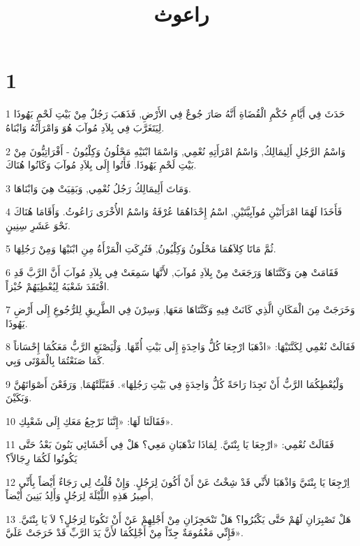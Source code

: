 

\title{راعوث}


\chapter{1}

\par 1 حَدَثَ فِي أَيَّامِ حُكْمِ الْقُضَاةِ أَنَّهُ صَارَ جُوعٌ فِي الأَرْضِ, فَذَهَبَ رَجُلٌ مِنْ بَيْتِ لَحْمِ يَهُوذَا لِيَتَغَرَّبَ فِي بِلاَدِ مُوآبَ هُوَ وَامْرَأَتُهُ وَابْنَاهُ.
\par 2 وَاسْمُ الرَّجُلِ أَلِيمَالِكُ, وَاسْمُ امْرَأَتِهِ نُعْمِي, وَاسْمَا ابْنَيْهِ مَحْلُونُ وَكِلْيُونُ - أَفْرَاتِيُّونَ مِنْ بَيْتِ لَحْمِ يَهُوذَا. فَأَتُوا إِلَى بِلاَدِ مُوآبَ وَكَانُوا هُنَاكَ.
\par 3 وَمَاتَ أَلِيمَالِكُ رَجُلُ نُعْمِي, وَبَقِيَتْ هِيَ وَابْنَاهَا.
\par 4 فَأَخَذَا لَهُمَا امْرَأَتَيْنِ مُوآبِيَّتَيْنِ, اسْمُ إِحْدَاهُمَا عُرْفَةُ وَاسْمُ الأُخْرَى رَاعُوثُ. وَأَقَامَا هُنَاكَ نَحْوَ عَشَرِ سِنِينٍ.
\par 5 ثُمَّ مَاتَا كِلاَهُمَا مَحْلُونُ وَكِلْيُونُ, فَتُرِكَتِ الْمَرْأَةُ مِنِ ابْنَيْهَا وَمِنْ رَجُلِهَا.
\par 6 فَقَامَتْ هِيَ وَكَنَّتَاهَا وَرَجَعَتْ مِنْ بِلاَدِ مُوآبَ, لأَنَّهَا سَمِعَتْ فِي بِلاَدِ مُوآبَ أَنَّ الرَّبَّ قَدِ افْتَقَدَ شَعْبَهُ لِيُعْطِيَهُمْ خُبْزاً.
\par 7 وَخَرَجَتْ مِنَ الْمَكَانِ الَّذِي كَانَتْ فِيهِ وَكَنَّتَاهَا مَعَهَا, وَسِرْنَ فِي الطَّرِيقِ لِلرُّجُوعِ إِلَى أَرْضِ يَهُوذَا.
\par 8 فَقَالَتْ نُعْمِي لِكَنَّتَيْهَا: «اذْهَبَا ارْجِعَا كُلُّ وَاحِدَةٍ إِلَى بَيْتِ أُمِّهَا. وَلْيَصْنَعِ الرَّبُّ مَعَكُمَا إِحْسَاناً كَمَا صَنَعْتُمَا بِالْمَوْتَى وَبِي.
\par 9 وَلْيُعْطِكُمَا الرَّبُّ أَنْ تَجِدَا رَاحَةً كُلُّ وَاحِدَةٍ فِي بَيْتِ رَجُلِهَا». فَقَبَّلَتْهُمَا, وَرَفَعْنَ أَصْوَاتَهُنَّ وَبَكَيْنَ.
\par 10 فَقَالَتَا لَهَا: «إِنَّنَا نَرْجِعُ مَعَكِ إِلَى شَعْبِكِ».
\par 11 فَقَالَتْ نُعْمِي: «ارْجِعَا يَا بِنْتَيَّ. لِمَاذَا تَذْهَبَانِ مَعِي؟ هَلْ فِي أَحْشَائِي بَنُونَ بَعْدُ حَتَّى يَكُونُوا لَكُمَا رِجَالاً؟
\par 12 اِرْجِعَا يَا بِنْتَيَّ وَاذْهَبَا لأَنِّي قَدْ شِخْتُ عَنْ أَنْ أَكُونَ لِرَجُلٍ. وَإِنْ قُلْتُ لِي رَجَاءٌ أَيْضاً بِأَنِّي أَصِيرُ هَذِهِ اللَّيْلَةَ لِرَجُلٍ وَأَلِدُ بَنِينَ أَيْضاً,
\par 13 هَلْ تَصْبِرَانِ لَهُمْ حَتَّى يَكْبُرُوا؟ هَلْ تَنْحَجِزَانِ مِنْ أَجْلِهِمْ عَنْ أَنْ تَكُونَا لِرَجُلٍ؟ لاَ يَا بِنْتَيَّ. فَإِنِّي مَغْمُومَةٌ جِدّاً مِنْ أَجْلِكُمَا لأَنَّ يَدَ الرَّبِّ قَدْ خَرَجَتْ عَلَيَّ».
